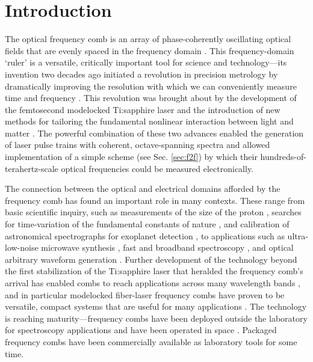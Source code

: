  \chapter{Introduction}
\label{chap:introduction}

The optical frequency comb is an array of phase-coherently oscillating optical fields that are evenly spaced in the frequency domain \cite{Hall2006,Hansch2006}. This frequency-domain `ruler' is a versatile, critically important tool for science and technology---its invention two decades ago initiated a revolution in precision metrology by dramatically improving the resolution with which we can conveniently measure time and frequency \cite{Diddams2000,Jones2000,Diddams2001,Udem2002}. This revolution was brought about by the development of the femtosecond modelocked Ti:sapphire laser \cite{Stingl1995} and the introduction of new methods for tailoring the fundamental nonlinear interaction between light and matter \cite{Ranka2000,Dudley2006}. The powerful combination of these two advances enabled the generation of laser pulse trains with coherent, octave-spanning spectra and allowed implementation of a simple scheme (see Sec. \ref{sec:f2f}) by which their hundreds-of-terahertz-scale optical frequencies could be measured electronically.

The connection between the optical and electrical domains afforded by the frequency comb has found an important role in many contexts. These range from basic scientific inquiry, such as measurements of the size of the proton \cite{Beyer2017}, searches for time-variation of the fundamental constants of nature \cite{Lea2007,Blatt2008}, and calibration of astronomical spectrographs for exoplanet detection \cite{Steinmetz2008}, to applications such as ultra-low-noise microwave synthesis \cite{McFerran2005,Fortier2011}, fast and broadband spectroscopy \cite{Diddams2007,Coddington2016}, and optical arbitrary waveform generation \cite{Cundiff2010}. Further development of the technology beyond the first stabilization of the Ti:sapphire laser that heralded the frequency comb's arrival has enabled combs to reach applications across many wavelength bands \cite{Washburn2004a,Gohle2005b,Diddams2010,Faist2016}, and in particular modelocked fiber-laser frequency combs have proven to be versatile, compact systems that are useful for many applications \cite{Newbury2007,Fermann2013,Sinclair2015}. The technology is reaching maturity---frequency combs have been deployed outside the laboratory for spectroscopy applications \cite{Sinclair2014,Coburn2018} and have been operated in space \cite{Lezius2016}. Packaged frequency combs have been commercially available as laboratory tools for some time.

